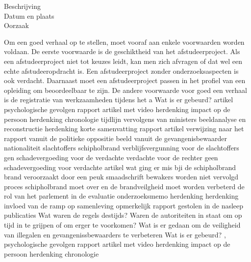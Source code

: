 \begin{description}
\item[Beschrijving]
\item[Datum en plaats] 
\item[Oorzaak]
\end{description}
Om een goed verhaal op te stellen, moet vooraf aan enkele voorwaarden
worden voldaan. De eerste voorwaarde is de geschiktheid van het
afstudeerproject. Als een afstudeerproject niet tot keuzes leidt, kan
men zich afvragen of dat wel een echte afstudeeropdracht is. Een
afstudeerproject zonder onderzoeksaspecten is ook verdacht. Daarnaast
moet een afstudeerproject passen in het profiel van een opleiding om
beoordeelbaar te zijn. De andere voorwaarde voor goed een verhaal is
de registratie van werkzaamheden tijdens het a
Wat is er gebeurd?
\cite{schipholbrand27102005video}
artikel
\cite{schipholbrand27102005video}
psychologische gevolgen
rapport
\cite{onderzoeksraad2610schipholoost}
artikel met video
herdenking
impact op de persoon
herdenking
\cite{schipholbrandvideoargos}
chronologie
\cite{nunl30052023feitenoverzicht}
tijdlijn
vervolgens van ministers
beeldanalyse en reconstructie
\cite{}
herdenking
korte samenvatting
rapport
artikel
verwijzing naar het rapport vanuit de politieke oppositie
beeld vanuit de gevangenisbewaarder
nationaliteit slachtoffers schipholbrand
verblijfsvergunning voor de slachtoffers
gen schadevergoeding voor de verdachte
verdachte voor de rechter
geen schadevergoeding voor verdachte
artikel wat ging er mis bji de schipholbrand
brand veroorzaakt door een peuk
smaadschrift
bewakers worden niet vervolgd
proces schipholbrand moet over en de brandveilgheid moet worden verbeterd
de rol van het parlement in de evaluatie
\cite{parlementairemonitorschipholbrand}
onderzoeksmemo
herdenking
herdenking
invloed van de ramp op samenleving
\cite{videonpoNOVA13112008}
opmerkelijk rapport gestolen in de nasleep
\cite{rizoomes01052014schipholbrand}
publicaties
\cite{heuvelkroesschipholbrandcamerabeelden}
Wat waren de regels destijds?
Waren de autoriteiten in staat om op tijd in te grijpen of om erger te voorkomen?
Wat is er gedaan om de veiligheid van illegalen en gevangenissbewaarders te verbeteren
Wat is er gebeurd?
\cite{wikiSchipholbrand},\cite{schipholbrand27102005video}
 psychologische gevolgen
rapport
\cite{onderzoeksraad2610schipholoost}
artikel met video
herdenking
impact op de persoon
herdenking
\cite{schipholbrandvideoargos}
chronologie
\cite{nunl30052023feitenoverzicht}
